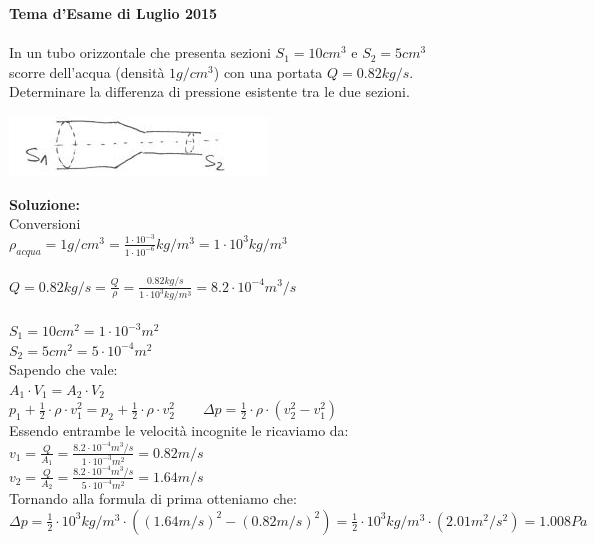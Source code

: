 \begin{figure}[h!]
\textbf{Tema d'Esame di Luglio 2015}\\ \\
In un tubo orizzontale che presenta sezioni $S_1=10cm^3$ e $S_2=5cm^3$ scorre dell'acqua (densità $1g/cm^3$) con una portata $Q=0.82kg/s$. Determinare la differenza di pressione esistente tra le due sezioni.
\\
\begin{center}
		\includegraphics[scale=1.6]{ES4/LUG042015.jpg}
	\end{center}
    
    \begin{boxed}
\textbf{Soluzione:}\\
Conversioni\\
$\rho_{acqua}=1g/cm^3=\frac{1\cdot 10^{-3}}{1\cdot 10^{-6}}kg/m^3=1\cdot 10^3kg/m^3 $\\\\
$Q=0.82kg/s= \frac{Q}{\rho}=\frac{0.82kg/s}{1\cdot10^3kg/m^3}=8.2\cdot10^{-4}m^3/s$\\ \\
$S_1=10cm^2 =1\cdot 10^{-3}m^2$\\
$S_2=5cm^2 =5\cdot 10^{-4}m^2$\\

Sapendo che vale:\\
$A_1\cdot V_1=A_2\cdot V_2$\\
$p_1 + \frac{1}{2}\cdot \rho \cdot v^2_1 = p_2 + \frac{1}{2}\cdot \rho \cdot v^2_2 \qquad \Delta p=\frac{1}{2}\cdot \rho \cdot (v^2_2 - v^2_1)$\\
Essendo entrambe le velocità incognite le ricaviamo da:\\
$v_1=\frac{Q}{A_1}=\frac{8.2\cdot10^{-4}m^3/s}{1\cdot 10^{-3}m^2}=0.82m/s$\\
$v_2=\frac{Q}{A_2}=\frac{8.2\cdot10^{-4}m^3/s}{5\cdot 10^{-4}m^2}=1.64m/s$\\
Tornando alla formula di prima otteniamo che:\\
$\Delta p=\frac{1}{2}\cdot 10^3kg/m^3 \cdot ((1.64m/s)^2 - (0.82m/s)^2)=\frac{1}{2}\cdot 10^3kg/m^3 \cdot (2.01m^2/s^2) =1.008Pa$
\end{boxed}
\end{figure}